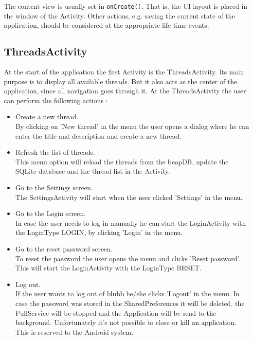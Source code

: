 \documentclass[12pt,a4paper,oneside]{report}
\newcommand{\appname}{blubb}
\newcommand{\beapDB}{beapDB}
\newcommand{\code}[1]{\lstinline{#1}}
\begin{document}
The content view is usually set in \code{onCreate()}. That is, the UI layout is placed in the window of the Activity. Other actions, e.g. saving the current state of the application, should be considered at the appropriate life time events.

\subsection{ThreadsActivity}
At the start of the application the first Activity is the ThreadsActivity.
Its main purpose is to display all available threads. 
But it also acts as the center of the application, since all navigation goes through it.
At the ThreadsActivity the user can perform the following actions :

\begin{itemize}
\item{Create a new thread.}\\
By clicking on 'New thread' in the menu the user opens a dialog where he can enter the title and description and create a new thread.

\item{Refresh the list of threads.}\\
This menu option will reload the threads from the \beapDB{}, update the SQLite database and the thread list in the Activity.

\item{Go to the Settings screen.}\\
The SettingsActivity will start when the user clicked 'Settings' in the menu.

\item{Go to the Login screen.}\\
In case the user needs to log in manually he can start the LoginActivity with the LoginType LOGIN, by clicking 'Login' in the menu. 

\item{Go to the reset password screen.}\\
To reset the password the user opens the menu and clicks 'Reset password'. This will start the LoginActivity with the LoginType RESET.

\item{Log out.}\\
If the user wants to log out of \appname{} he/she clicks 'Logout' in the menu. In case the password was stored in the SharedPreferences it will be deleted, the PullService will be stopped and the Application will be send to the background. Unfortunately it's not possible to close or kill an application. This is reserved to the Android system.


\end{itemize}
\end{document}
